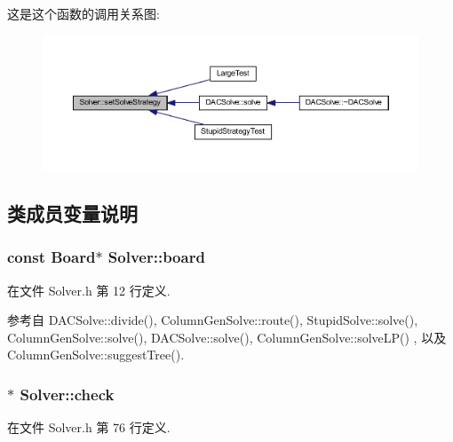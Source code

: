 这是这个函数的调用关系图\+:
\nopagebreak
\begin{figure}[H]
\begin{center}
\leavevmode
\includegraphics[width=350pt]{classSolver_a2b07dd3c581eeb3207036430082cb2f9_icgraph}
\end{center}
\end{figure}




\subsection{类成员变量说明}
\subsubsection[{\texorpdfstring{board}{board}}]{\setlength{\rightskip}{0pt plus 5cm}const {\bf Board}$\ast$ Solver\+::board}\hypertarget{classSolver_a8966a22c2f247addc8ce453d119bc54e}{}\label{classSolver_a8966a22c2f247addc8ce453d119bc54e}


在文件 Solver.\+h 第 12 行定义.



参考自 D\+A\+C\+Solve\+::divide(), Column\+Gen\+Solve\+::route(), Stupid\+Solve\+::solve(), Column\+Gen\+Solve\+::solve(), D\+A\+C\+Solve\+::solve(), Column\+Gen\+Solve\+::solve\+L\+P() , 以及 Column\+Gen\+Solve\+::suggest\+Tree().

\subsubsection[{\texorpdfstring{check}{check}}]{$\ast$ Solver\+::check\hspace{0.3cm}{\ttfamily [private]}}\hypertarget{classSolver_af9c1ccc9336ccdee35dcc7c1c0e39a95}{}\label{classSolver_af9c1ccc9336ccdee35dcc7c1c0e39a95}


在文件 Solver.\+h 第 76 行定义.



